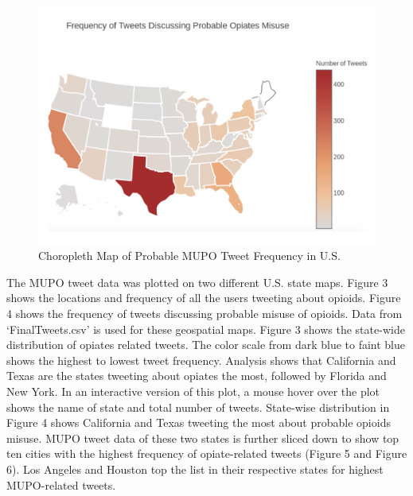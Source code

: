 \documentclass[sigconf]{acmart}
\begin{document}
\begin{figure}[!ht]
  \centering\includegraphics[width=\columnwidth]{images/Figure4.pdf}
  \caption{Choropleth Map of Probable MUPO Tweet Frequency in U.S.}
  \label{f:Figure4}
\end{figure}

The MUPO tweet data was plotted on two different U.S. state maps. Figure 3 
shows the locations and frequency of all the users tweeting about opioids. 
Figure 4 shows the frequency of tweets discussing probable misuse of opioids. 
Data from `FinalTweets.csv' is used for these geospatial maps. Figure 3 shows 
the state-wide distribution of opiates related tweets. The color scale from 
dark blue to faint blue shows the highest to lowest tweet frequency. Analysis 
shows that California and Texas are the states tweeting about opiates the most, 
followed by Florida and New York. In an interactive version of this plot, a 
mouse hover over the plot shows the name of state and total number of tweets. 
State-wise distribution in Figure 4 shows California and Texas tweeting the 
most about probable opioids misuse. MUPO tweet data of these two states is 
further sliced down to show top ten cities with the highest frequency of 
opiate-related tweets (Figure 5 and Figure 6). Los Angeles and Houston top 
the list in their respective states for highest MUPO-related tweets. 
\end{document}
